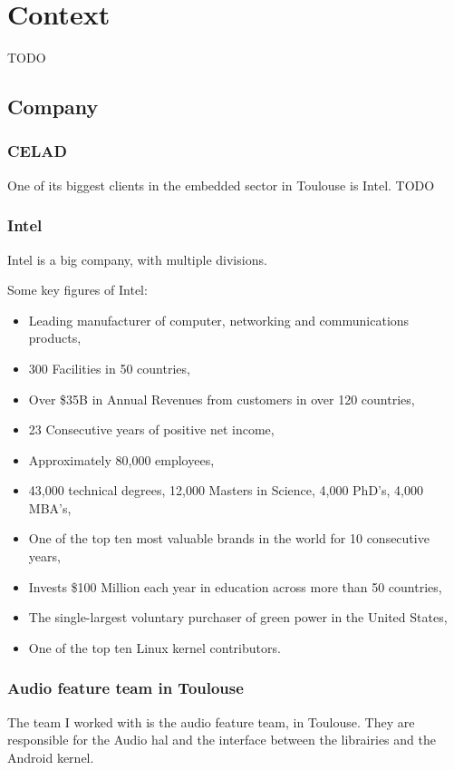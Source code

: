 \chapter{Context}\label{chap:context}

\begin{sectionIntro}
    TODO
\end{sectionIntro}

\section{Company}

\subsection{CELAD}
One of its biggest clients in the embedded sector in Toulouse is Intel.
TODO

\subsection{Intel}
Intel is a big company, with multiple divisions.

Some key figures of Intel:
\begin{itemize}
\item Leading manufacturer of computer, networking and communications
  products,
  \item 300 Facilities in 50 countries,
  \item Over \$35B in Annual Revenues from customers in over 120
    countries,
\item 23 Consecutive years of positive net income,
\item Approximately 80,000 employees,
\item 43,000 technical degrees, 12,000 Masters in Science, 4,000
  PhD’s, 4,000 MBA’s,
  \item One of the top ten most valuable brands in the world for 10
    consecutive years,
\item Invests \$100 Million each year in education across more than 50
  countries,
  \item The single-largest voluntary purchaser of green power in the
    United States,
\item One of the top ten Linux \gls{kernel} contributors.
\end{itemize}

\subsection{Audio feature team in Toulouse}
The team I worked with is the audio feature team, in Toulouse.
They are responsible for the Audio \gls{hal} and the interface between the
librairies and the Android \gls{kernel}.


